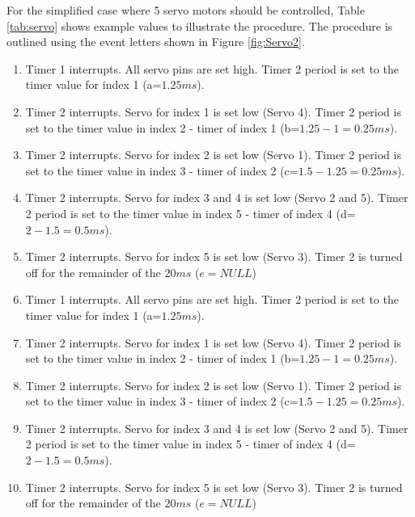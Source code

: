 For the simplified case where 5 servo motors should be controlled, Table \ref{tab:servo} shows example values to illustrate the procedure. The procedure is outlined using the event letters shown in Figure \ref{fig:Servo2}.
\begin{enumerate}[label = \Alph*]
\item Timer 1 interrupts. All servo pins are set high. Timer 2 period is set to the timer value for index 1 (a=$1.25ms$).
\item Timer 2 interrupts. Servo for index 1 is set low (Servo 4). Timer 2 period is set to the timer value in index 2 - timer of index 1 (b=$1.25-1 = 0.25ms$).
\item Timer 2 interrupts. Servo for index 2 is set low (Servo 1). Timer 2 period is set to the timer value in index 3 - timer of index 2 (c=$1.5-1.25 = 0.25ms$).
\item Timer 2 interrupts. Servo for index 3 and 4 is set low (Servo 2 and 5). Timer 2 period is set to the timer value in index 5 - timer of index 4 (d=$2-1.5 = 0.5ms$).
\item Timer 2 interrupts. Servo for index 5 is set low (Servo 3). Timer 2 is turned off for the remainder of the $20ms$ ($e=NULL$)
\item Timer 1 interrupts. All servo pins are set high. Timer 2 period is set to the timer value for index 1 (a=$1.25ms$).
\item Timer 2 interrupts. Servo for index 1 is set low (Servo 4). Timer 2 period is set to the timer value in index 2 - timer of index 1 (b=$1.25-1 = 0.25ms$).
\item Timer 2 interrupts. Servo for index 2 is set low (Servo 1). Timer 2 period is set to the timer value in index 3 - timer of index 2 (c=$1.5-1.25 = 0.25ms$).
\item Timer 2 interrupts. Servo for index 3 and 4 is set low (Servo 2 and 5). Timer 2 period is set to the timer value in index 5 - timer of index 4 (d=$2-1.5 = 0.5ms$).
\item Timer 2 interrupts. Servo for index 5 is set low (Servo 3). Timer 2 is turned off for the remainder of the $20ms$ ($e=NULL$)
\end{enumerate}

